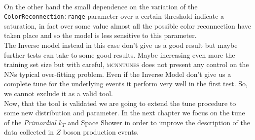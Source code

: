 \\ 
On the other hand the small dependence on the variation of the \texttt{Color}\-\texttt{Reconnection:}\-\texttt{range} parameter over a certain threshold indicate a saturation, in fact over some value almost all the possible color reconnection have taken place and so the model is less sensitive to this parameter.   
\\
The Inverse model instead in this case don't give us a good result but maybe further tests can take to some good results. Maybe increasing even more the training set size but with careful, \textsc{mcnntunes} does not present any control on the NNs typical over-fitting problem. Even if the Inverse Model don't give us a complete tune for the underlying events it perform very well in the first test. So, we cannot exclude it as a valid tool. 
\\
Now, that the tool is validated we are going to extend the tune procedure to some new distribution and parameter. In the next chapter we focus on the tune of the \textit{Primordial $k_T$} and Space Shower in order to improve the description of the data collected in $Z$ boson production events.




